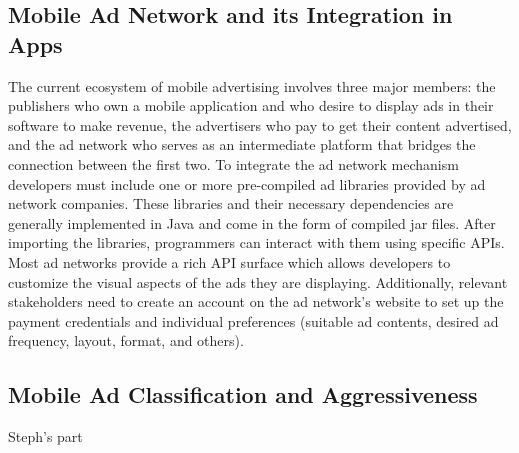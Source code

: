 \documentclass[conference]{IEEEtran}
\begin{document}
\subsection{Mobile Ad Network and its Integration in Apps}
The current ecosystem of mobile advertising involves three major members: the publishers who own a mobile application and who desire to display ads in their software to make revenue, the advertisers who pay to get their content advertised, and the ad network who serves as an intermediate platform that bridges the connection between the first two. To integrate the ad network mechanism developers must include one or more pre-compiled ad libraries provided by ad network companies. These libraries and their necessary dependencies are generally implemented in Java and come in the form of compiled jar files. After importing the libraries, programmers can interact with them using specific APIs. Most ad networks provide a rich API surface which allows developers to customize the visual aspects of the ads they are displaying. Additionally, relevant stakeholders need to create an account on the ad network’s website to set up the payment credentials and individual preferences (suitable ad contents, desired ad frequency, layout, format, and others). 

\subsection{Mobile Ad Classification and Aggressiveness}
Steph's part
\end{document}

